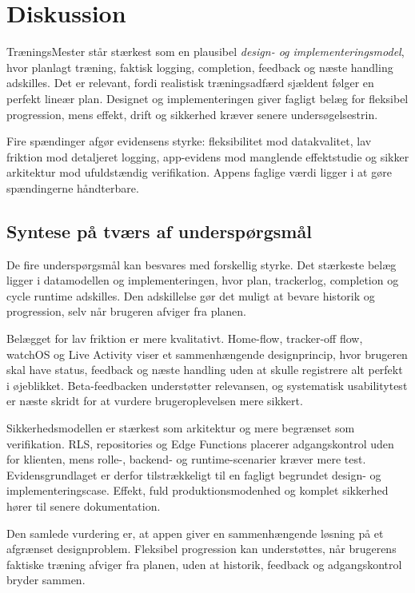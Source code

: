 \section{Diskussion}

TræningsMester står stærkest som en plausibel \emph{design- og implementeringsmodel}, hvor planlagt træning, faktisk logging, completion, feedback og næste handling adskilles. Det er relevant, fordi realistisk træningsadfærd sjældent følger en perfekt lineær plan. Designet og implementeringen giver fagligt belæg for fleksibel progression, mens effekt, drift og sikkerhed kræver senere undersøgelsestrin.

Fire spændinger afgør evidensens styrke: fleksibilitet mod datakvalitet, lav friktion mod detaljeret logging, app-evidens mod manglende effektstudie og sikker arkitektur mod ufuldstændig verifikation. Appens faglige værdi ligger i at gøre spændingerne håndterbare.

\subsection{Syntese på tværs af underspørgsmål}

De fire underspørgsmål kan besvares med forskellig styrke. Det stærkeste belæg ligger i datamodellen og implementeringen, hvor plan, trackerlog, completion og cycle runtime adskilles. Den adskillelse gør det muligt at bevare historik og progression, selv når brugeren afviger fra planen.

Belægget for lav friktion er mere kvalitativt. Home-flow, tracker-off flow, watchOS og Live Activity viser et sammenhængende designprincip, hvor brugeren skal have status, feedback og næste handling uden at skulle registrere alt perfekt i øjeblikket. Beta-feedbacken understøtter relevansen, og systematisk usabilitytest er næste skridt for at vurdere brugeroplevelsen mere sikkert.

Sikkerhedsmodellen er stærkest som arkitektur og mere begrænset som verifikation. RLS, repositories og Edge Functions placerer adgangskontrol uden for klienten, mens rolle-, backend- og runtime-scenarier kræver mere test. Evidensgrundlaget er derfor tilstrækkeligt til en fagligt begrundet design- og implementeringscase. Effekt, fuld produktionsmodenhed og komplet sikkerhed hører til senere dokumentation.

Den samlede vurdering er, at appen giver en sammenhængende løsning på et afgrænset designproblem. Fleksibel progression kan understøttes, når brugerens faktiske træning afviger fra planen, uden at historik, feedback og adgangskontrol bryder sammen.


